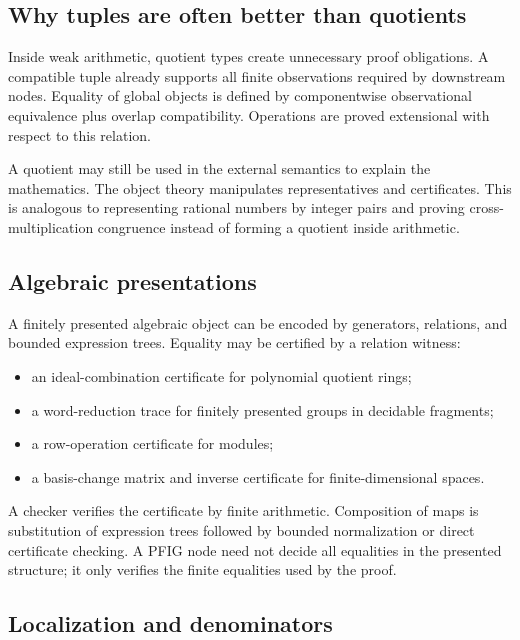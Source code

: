 \subsection{Why tuples are often better than quotients}

Inside weak arithmetic, quotient types create unnecessary proof obligations.  A compatible tuple already supports all finite observations required by downstream nodes.  Equality of global objects is defined by componentwise observational equivalence plus overlap compatibility.  Operations are proved extensional with respect to this relation.

A quotient may still be used in the external semantics to explain the mathematics.  The object theory manipulates representatives and certificates.  This is analogous to representing rational numbers by integer pairs and proving cross-multiplication congruence instead of forming a quotient inside arithmetic.

\subsection{Algebraic presentations}

A finitely presented algebraic object can be encoded by generators, relations, and bounded expression trees.  Equality may be certified by a relation witness:

\begin{itemize}
\item an ideal-combination certificate for polynomial quotient rings;
\item a word-reduction trace for finitely presented groups in decidable fragments;
\item a row-operation certificate for modules;
\item a basis-change matrix and inverse certificate for finite-dimensional spaces.
\end{itemize}

A checker verifies the certificate by finite arithmetic.  Composition of maps is substitution of expression trees followed by bounded normalization or direct certificate checking.  A PFIG node need not decide all equalities in the presented structure; it only verifies the finite equalities used by the proof.

\subsection{Localization and denominators}

